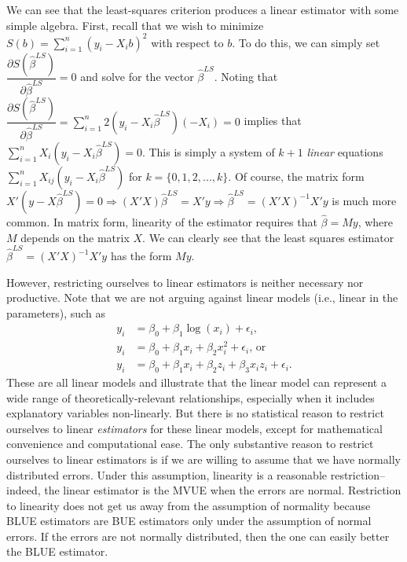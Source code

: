 \documentclass[12pt]{article}
\begin{document}
We can see that the least-squares criterion produces a linear estimator with some simple algebra. 
First, recall that we wish to minimize $S(b) = \sum_{i = 1}^n(y_i - X_ib)^2$ with respect to $b$. 
To do this, we can simply set $\dfrac{\partial S(\hat{\beta}^{LS})}{\partial \hat{\beta}^{LS}} = 0$ and solve for the vector $\hat{\beta}^{LS}$. 
Noting that $\dfrac{\partial S(\hat{\beta}^{LS})}{\partial \hat{\beta}^{LS}} = \sum_{i = 1}^n 2(y_i - X_i\hat{\beta}^{LS})(-X_i) = 0$ implies that $\sum_{i = 1}^n X_i(y_i - X_i\hat{\beta}^{LS}) = 0$. 
This is simply a system of $k+1$ \textit{linear} equations $\sum_{i = 1}^n X_{ij}(y_i - X_i\hat{\beta}^{LS})$ for $k = \{0, 1, 2,..., k\}$. 
Of course, the matrix form $X'(y - X\hat{\beta}^{LS}) = 0 \Rightarrow (X'X)\hat{\beta}^{LS} = X'y \Rightarrow \hat{\beta}^{LS} = (X'X)^{-1}X'y$ is much more common. 
In matrix form, linearity of the estimator requires that $\hat{\beta} = My$, where $M$ depends on the matrix $X$. 
We can clearly see that the least squares estimator $\hat{\beta}^{LS} = (X'X)^{-1}X'y$ has the form $My$.

However, restricting ourselves to linear estimators is neither necessary nor productive. 
Note that we are not arguing against linear models (i.e., linear in the parameters), such as 
\begin{align*}
y_i &= \beta_0 + \beta_1\log(x_i) + \epsilon_i\text{,}\\
y_i &= \beta_0 + \beta_1x_i + \beta_2x_i^2 + \epsilon_i\text{, or}\\ 
y_i &= \beta_0 + \beta_1x_i + \beta_2z_i + \beta_3x_iz_i + \epsilon_i\textit{.}
\end{align*}
These are all linear models and illustrate that the linear model can represent a wide range of theoretically-relevant relationships, especially when it includes explanatory variables non-linearly. 
But there is no statistical reason to restrict ourselves to linear \textit{estimators} for these linear models, except for mathematical convenience and computational ease.
The only substantive reason to restrict ourselves to linear estimators is if we are willing to assume that we have normally distributed errors. 
Under this assumption, linearity is a reasonable restriction--indeed, the linear estimator is the MVUE when the errors are normal.
Restriction to linearity does not get us away from the assumption of normality because BLUE estimators are BUE estimators only under the assumption of normal errors.
If the errors are not normally distributed, then the one can easily better the BLUE estimator.
\end{document}
